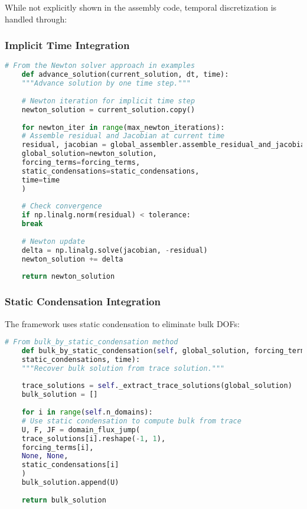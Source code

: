 While not explicitly shown in the assembly code, temporal discretization is handled through:

\subsubsection{Implicit Time Integration}

\begin{lstlisting}[language=Python, caption=Time Integration Framework]
	# From the Newton solver approach in examples
	def advance_solution(current_solution, dt, time):
	"""Advance solution by one time step."""
	
	# Newton iteration for implicit time step
	newton_solution = current_solution.copy()
	
	for newton_iter in range(max_newton_iterations):
	# Assemble residual and Jacobian at current time
	residual, jacobian = global_assembler.assemble_residual_and_jacobian(
	global_solution=newton_solution,
	forcing_terms=forcing_terms,
	static_condensations=static_condensations,
	time=time
	)
	
	# Check convergence
	if np.linalg.norm(residual) < tolerance:
	break
	
	# Newton update
	delta = np.linalg.solve(jacobian, -residual)
	newton_solution += delta
	
	return newton_solution
\end{lstlisting}

\subsubsection{Static Condensation Integration}

The framework uses static condensation to eliminate bulk DOFs:

\begin{lstlisting}[language=Python, caption=Static Condensation for Time Integration]
	# From bulk_by_static_condensation method
	def bulk_by_static_condensation(self, global_solution, forcing_terms, 
	static_condensations, time):
	"""Recover bulk solution from trace solution."""
	
	trace_solutions = self._extract_trace_solutions(global_solution)
	bulk_solution = []
	
	for i in range(self.n_domains):
	# Use static condensation to compute bulk from trace
	U, F, JF = domain_flux_jump(
	trace_solutions[i].reshape(-1, 1),
	forcing_terms[i],
	None, None,
	static_condensations[i]
	)
	bulk_solution.append(U)
	
	return bulk_solution
\end{lstlisting}

